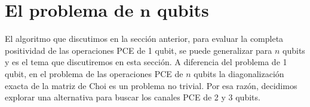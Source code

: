 \section{El problema de $\mathbf{n}$ qubits} %
\label{sec:n_qubits_problem}

%

El algoritmo que discutimos en la sección anterior, 
para evaluar la completa positividad de las operaciones
PCE de 1 qubit, se puede generalizar para $n$ qubits y es 
el tema que discutiremos en esta sección. A diferencia 
del problema de 1 qubit, en el problema de las operaciones PCE de $n$ qubits
la diagonalización exacta de la matriz de Choi es un problema no trivial. 
Por esa razón, decidimos explorar una alternativa para buscar 
los canales PCE de 2 y 3 qubits.

